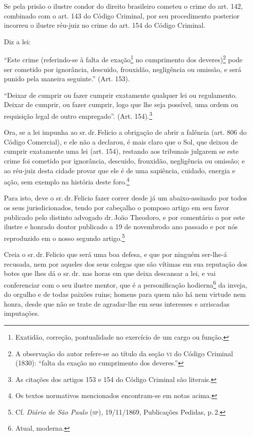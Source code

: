 Se pela prisão o ilustre condor do direito brasileiro cometeu o crime do
art. 142, combinado com o art. 143 do Código Criminal, por seu
procedimento posterior incorreu o ilustre réu-juiz no crime do art. 154
do Código Criminal.

Diz a lei:

``Este crime (referindo-se à falta de exação\footnote{ Exatidão,
  correção, pontualidade no exercício de um cargo ou função.} no
cumprimento dos deveres)\footnote{ A observação do autor refere-se ao
  título da seção \textsc{vi} do Código Criminal (1830): ``falta da exação no
  cumprimento dos deveres.''} pode ser cometido por ignorância, descuido,
frouxidão, negligência ou omissão, e será punido pela maneira seguinte.''
(Art. 153).

``Deixar de cumprir ou fazer cumprir exatamente qualquer lei ou
regulamento. Deixar de cumprir, ou fazer cumprir, logo que lhe seja
possível, uma ordem ou requisição legal de outro empregado''. (Art.
154).\footnote{ As citações dos artigos 153 e 154 do Código Criminal
  são literais.}

Ora, se a lei impunha ao sr.\,dr.\,Felicio a obrigação de abrir a falência
(art. 806 do Código Comercial), e ele não a declarou, é mais claro que o
Sol, que deixou de cumprir exatamente uma lei (art. 154), restando aos
tribunais julgarem se este crime foi cometido por ignorância, descuido,
frouxidão, negligência ou omissão; e ao réu-juiz desta cidade provar que
ele é de uma sapiência, cuidado, energia e ação, sem exemplo na história
deste foro.\footnote{ Os textos normativos mencionados encontram-se em
  notas acima.}

Para isto, deve o sr.\,dr.\,Felicio fazer correr desde já um
abaixo-assinado por todos os seus jurisdicionados, tendo por cabeçalho o
pomposo artigo em seu favor publicado pelo distinto advogado dr.\,João
Theodoro, e por comentário o por este ilustre e honrado doutor publicado
a 19 de novembrodo ano passado e por nós reproduzido em o nosso segundo
artigo.\footnote{ Cf. \emph{Diário de São Paulo} (\textsc{sp}), 19/11/1869,
  Publicações Pedidas, p.\,2.}

Creia o sr.\,dr.\,Felicio que será uma boa defesa, e que por ninguém
ser-lhe-á recusada, nem por aqueles dos seus colegas que são vítimas em
sua reputação dos botes que lhes dá o sr.\,dr. nas horas em que deixa
descansar a lei, e vai conferenciar com o seu ilustre mentor, que é a
personificação hodierna\footnote{ Atual, moderna.} da inveja, do
orgulho e de todas paixões ruins; homens para quem não há nem virtude
nem honra, desde que não se trate de agradar-lhe em seus interesses e
arriscadas imputações.

